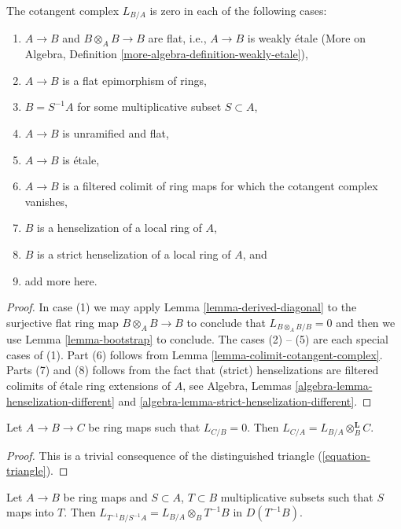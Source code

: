 \begin{lemma}
\label{lemma-when-zero}
The cotangent complex $L_{B/A}$ is zero in each of the following cases:
\begin{enumerate}
\item $A \to B$ and $B \otimes_A B \to B$ are flat, i.e., $A \to B$
is weakly \'etale
(More on Algebra, Definition \ref{more-algebra-definition-weakly-etale}),
\item $A \to B$ is a flat epimorphism of rings,
\item $B = S^{-1}A$ for some multiplicative subset $S \subset A$,
\item $A \to B$ is unramified and flat,
\item $A \to B$ is \'etale,
\item $A \to B$ is a filtered colimit of ring maps for which
the cotangent complex vanishes,
\item $B$ is a henselization of a local ring of $A$,
\item $B$ is a strict henselization of a local ring of $A$, and
\item add more here.
\end{enumerate}
\end{lemma}

\begin{proof}
In case (1) we may apply
Lemma \ref{lemma-derived-diagonal}
to the surjective flat ring map $B \otimes_A B \to B$
to conclude that $L_{B \otimes_A B/B} = 0$ and then we use
Lemma \ref{lemma-bootstrap}
to conclude. The cases (2) -- (5) are each special cases of (1).
Part (6) follows from Lemma \ref{lemma-colimit-cotangent-complex}.
Parts (7) and (8) follows from the fact that (strict) henselizations
are filtered colimits of \'etale ring extensions of $A$, see
Algebra, Lemmas \ref{algebra-lemma-henselization-different} and
\ref{algebra-lemma-strict-henselization-different}.
\end{proof}

\begin{lemma}
\label{lemma-localize-on-top}
Let $A \to B \to C$ be ring maps such that $L_{C/B} = 0$.
Then $L_{C/A} = L_{B/A} \otimes_B^\mathbf{L} C$.
\end{lemma}

\begin{proof}
This is a trivial consequence of 
the distinguished triangle (\ref{equation-triangle}).
\end{proof}

\begin{lemma}
\label{lemma-localize}
Let $A \to B$ be ring maps and $S \subset A$, $T \subset B$ multiplicative
subsets such that $S$ maps into $T$.
Then $L_{T^{-1}B/S^{-1}A} = L_{B/A} \otimes_B T^{-1}B$
in $D(T^{-1}B)$.
\end{lemma}

